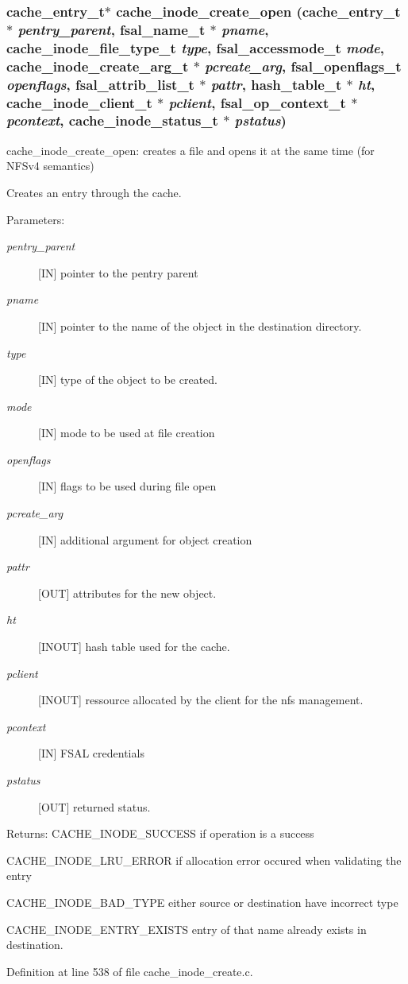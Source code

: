 \subsubsection[{cache\_\-inode\_\-create\_\-open}]{\setlength{\rightskip}{0pt plus 5cm}cache\_\-entry\_\-t$\ast$ cache\_\-inode\_\-create\_\-open (cache\_\-entry\_\-t $\ast$ {\em pentry\_\-parent}, \/  fsal\_\-name\_\-t $\ast$ {\em pname}, \/  cache\_\-inode\_\-file\_\-type\_\-t {\em type}, \/  fsal\_\-accessmode\_\-t {\em mode}, \/  cache\_\-inode\_\-create\_\-arg\_\-t $\ast$ {\em pcreate\_\-arg}, \/  fsal\_\-openflags\_\-t {\em openflags}, \/  fsal\_\-attrib\_\-list\_\-t $\ast$ {\em pattr}, \/  hash\_\-table\_\-t $\ast$ {\em ht}, \/  cache\_\-inode\_\-client\_\-t $\ast$ {\em pclient}, \/  fsal\_\-op\_\-context\_\-t $\ast$ {\em pcontext}, \/  cache\_\-inode\_\-status\_\-t $\ast$ {\em pstatus})}\label{cache__inode__create_8c_df579a07e747b4c05adb6393c836c518}


cache\_\-inode\_\-create\_\-open: creates a file and opens it at the same time (for NFSv4 semantics)

Creates an entry through the cache.

\begin{Desc}
\item[Parameters:]
\begin{description}
\item[{\em pentry\_\-parent}][IN] pointer to the pentry parent \item[{\em pname}][IN] pointer to the name of the object in the destination directory. \item[{\em type}][IN] type of the object to be created. \item[{\em mode}][IN] mode to be used at file creation \item[{\em openflags}][IN] flags to be used during file open \item[{\em pcreate\_\-arg}][IN] additional argument for object creation \item[{\em pattr}][OUT] attributes for the new object. \item[{\em ht}][INOUT] hash table used for the cache. \item[{\em pclient}][INOUT] ressource allocated by the client for the nfs management. \item[{\em pcontext}][IN] FSAL credentials \item[{\em pstatus}][OUT] returned status.\end{description}
\end{Desc}
\begin{Desc}
\item[Returns:]CACHE\_\-INODE\_\-SUCCESS if operation is a success \par
 

CACHE\_\-INODE\_\-LRU\_\-ERROR if allocation error occured when validating the entry\par
 

CACHE\_\-INODE\_\-BAD\_\-TYPE either source or destination have incorrect type\par
 

CACHE\_\-INODE\_\-ENTRY\_\-EXISTS entry of that name already exists in destination. \end{Desc}


Definition at line 538 of file cache\_\-inode\_\-create.c.